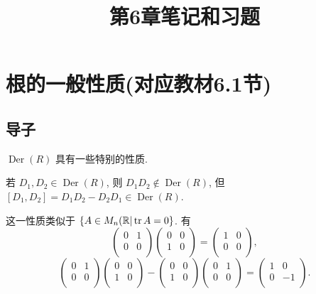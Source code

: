 \documentclass[UTF8]{ctexart}
\title{第6章笔记和习题}
\begin{document}
\maketitle
\section{根的一般性质(对应教材6.1节)}
\subsection{导子}
$\operatorname{Der}(R)$ 具有一些特别的性质.
\begin{example}
    若 $D_1,D_2\in\operatorname{Der}(R)$, 则 $D_1D_2\notin\operatorname{Der}(R)$, 但 $[D_1,D_2]=D_1D_2-D_2D_1\in\operatorname{Der}(R)$.

    这一性质类似于 $\{A\in M_n(\mathbb{R}|\operatorname{tr} A=0\}$. 有
    \[\begin{pmatrix}
        0 & 1 \\
        0 & 0 \\
    \end{pmatrix}\begin{pmatrix}
        0 & 0 \\
        1 & 0 \\
    \end{pmatrix}=\begin{pmatrix}
        1 & 0 \\
        0 & 0 \\
    \end{pmatrix},\]
    \[\begin{pmatrix}
        0 & 1 \\
        0 & 0 \\
    \end{pmatrix}\begin{pmatrix}
        0 & 0 \\
        1 & 0 \\
    \end{pmatrix}-\begin{pmatrix}
        0 & 0 \\
        1 & 0 \\
    \end{pmatrix}\begin{pmatrix}
        0 & 1 \\
        0 & 0 \\
    \end{pmatrix}=\begin{pmatrix}
        1 & 0 \\
        0 & -1 \\
    \end{pmatrix}.\]
\end{example}
\end{document}
